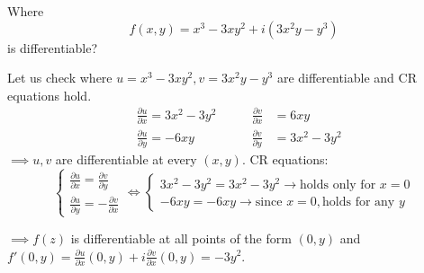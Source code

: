 \begin{example}
Where \[f(x,y) = x^3 - 3xy^2 + i(3x^2y - y^3)\] is differentiable?

\begin{soln}  Let us check where $u = x^3 - 3xy^2, v = 3x^2y - y^3$ are differentiable and CR equations hold.
\begin{align*}
        & \frac{\partial u}{\partial x} = 3x^2 - 3y^2 \qquad & \frac{\partial v}{\partial x} &= 6xy \\
        & \frac{\partial u}{\partial y} = -6xy \qquad &\frac{\partial v}{\partial y} &= 3x^2 - 3y^2  
\end{align*}
$\implies u, v$ are differentiable at every $(x,y)$. CR equations:
\[
\begin{cases}
\frac{\partial u}{\partial x} = \frac{\partial v}{\partial y} \\
\frac{\partial u}{\partial y} = -\frac{\partial v}{\partial x}
\end{cases}
\iff
\begin{cases}
3x^2 - 3y^2 = 3x^2 - 3y^2 \to \text{holds only for } x = 0 \\
-6xy = -6xy \to \text{since } x = 0, \text{holds for any } y
\end{cases}
\]

$\implies f(z)$ is differentiable at all points of the form $(0, y)$ and $f'(0, y) = \frac{\partial u}{\partial x}(0, y) + i\frac{\partial v}{\partial x}(0, y) = -3y^2$.
\end{soln}

\end{example}